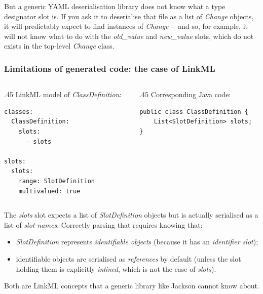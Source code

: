 \begin{frame}[fragile]
{  But a generic YAML deserialisation library does not know what a type
  designator slot is. If you ask it to deserialise that file as a list
  of \emph{Change} objects, it will predictably expect to find instances
  of \emph{Change} --~and so, for example, it will not know what to do
  with the \emph{old\_value} and \emph{new\_value} slots, which do not
  exists in the top-level \emph{Change} class.}
\end{frame}

\begin{frame}[fragile]
  \frametitle{Limitations of generated code: the case of LinkML}

  \begin{columns}[t]
    \begin{column}{.45\textwidth}
    LinkML model of \emph{ClassDefinition}:
\begin{Verbatim}[frame=single,fontsize=\scriptsize]
classes:
  ClassDefinition:
    slots:
      - slots

slots:
  slots:
    range: SlotDefinition
    multivalued: true
\end{Verbatim}
    \end{column}
    \begin{column}{.45\textwidth}
    Corresponding Java code:
\begin{Verbatim}[frame=single,fontsize=\scriptsize]
public class ClassDefinition {
    List<SlotDefinition> slots;
}
\end{Verbatim}
    \end{column}
  \end{columns}

  \bigskip

  The \emph{slots} slot expects a list of \emph{SlotDefinition} objects
  but is actually serialised as a list of \emph{slot names}. Correctly
  parsing that requires knowing that:

  \begin{itemize}
    \item \emph{SlotDefinition} represents \emph{identifiable objects}
    (because it has an \emph{identifier slot});
    \item identifiable objects are serialised as \emph{references} by
    default (unless the slot holding them is explicitly \emph{inlined},
    which is not the case of \emph{slots}).
  \end{itemize}

  \medskip
  Both are LinkML concepts that a generic library like Jackson cannot
  know about.


\end{frame}
